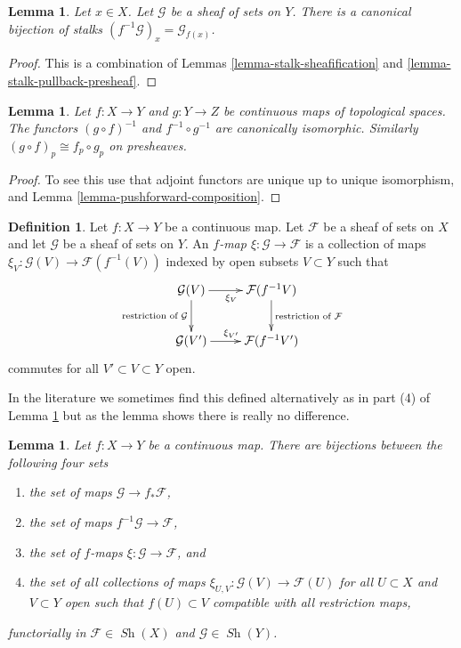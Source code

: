 \documentclass{stacks-project}
\theoremstyle{plain}
\newtheorem{lemma}[subsection]{Lemma}
\theoremstyle{definition}
\newtheorem{definition}[subsection]{Definition}
\theoremstyle{remark}
\numberwithin{equation}{subsection}
\def\Sh{\mathop{\mathit{Sh}}\nolimits}
\begin{document}
\begin{lemma}
\label{lemma-stalk-pullback}
Let $x \in X$. Let $\mathcal{G}$ be a sheaf of sets on $Y$.
There is a canonical bijection of stalks
$(f^{-1}\mathcal{G})_x = \mathcal{G}_{f(x)}$.
\end{lemma}

\begin{proof}
This is a combination of Lemmas \ref{lemma-stalk-sheafification}
and \ref{lemma-stalk-pullback-presheaf}.
\end{proof}

\begin{lemma}
\label{lemma-pullback-composition}
Let $f : X \to Y$ and $g : Y \to Z$ be continuous maps
of topological spaces. The functors $(g \circ f)^{-1}$
and $f^{-1} \circ g^{-1}$ are canonically isomorphic.
Similarly $(g \circ f)_p \cong f_p \circ g_p$ on
presheaves.
\end{lemma}

\begin{proof}
To see this
use that adjoint functors are unique up to unique isomorphism,
and Lemma \ref{lemma-pushforward-composition}.
\end{proof}

\begin{definition}
\label{definition-f-map}
Let $f : X \to Y$ be a continuous map.
Let $\mathcal{F}$ be a sheaf of sets on $X$ and
let $\mathcal{G}$ be a sheaf of sets on $Y$.
An {\it $f$-map $\xi : \mathcal{G} \to \mathcal{F}$}
is a collection of maps
$\xi_V : \mathcal{G}(V) \to \mathcal{F}(f^{-1}(V))$
indexed by open subsets $V \subset Y$ such that
$$
\xymatrix{
\mathcal{G}(V) \ar[r]_{\xi_V} \ar[d]_{\text{restriction of }\mathcal{G}} &
\mathcal{F}(f^{-1}V) \ar[d]^{\text{restriction of }\mathcal{F}} \\
\mathcal{G}(V') \ar[r]^{\xi_{V'}} &
\mathcal{F}(f^{-1}V')
}
$$
commutes for all $V' \subset V \subset Y$ open.
\end{definition}

\noindent
In the literature we sometimes find this defined alternatively
as in part (4) of Lemma \ref{lemma-f-map} but as the lemma shows there
is really no difference.

\begin{lemma}
\label{lemma-f-map}
Let $f : X \to Y$ be a continuous map.
There are bijections between the following four sets
\begin{enumerate}
\item the set of maps $\mathcal{G} \to f_*\mathcal{F}$,
\item the set of maps $f^{-1}\mathcal{G} \to \mathcal{F}$,
\item the set of $f$-maps $\xi : \mathcal{G} \to \mathcal{F}$, and
\item the set of all collections of maps
$\xi_{U, V} : \mathcal{G}(V) \to \mathcal{F}(U)$ for all
$U \subset X$ and $V \subset Y$ open such that $f(U) \subset V$
compatible with all restriction maps,
\end{enumerate}
functorially in $\mathcal{F} \in \Sh(X)$ and $\mathcal{G} \in \Sh(Y)$.
\end{lemma}
\end{document}
